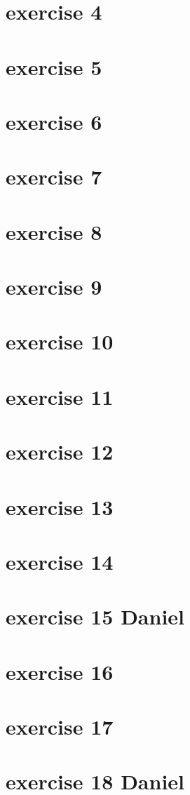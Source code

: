 \documentclass{article}
\begin{document}
\section{exercise 4}
\section{exercise 5}
\section{exercise 6}
\section{exercise 7}
\section{exercise 8}
\section{exercise 9}
\section{exercise 10}
\section{exercise 11}
\section{exercise 12}
\section{exercise 13}
\section{exercise 14}
\section{exercise 15 Daniel}
\section{exercise 16}
\section{exercise 17}
\section{exercise 18 Daniel}
\end{document}
